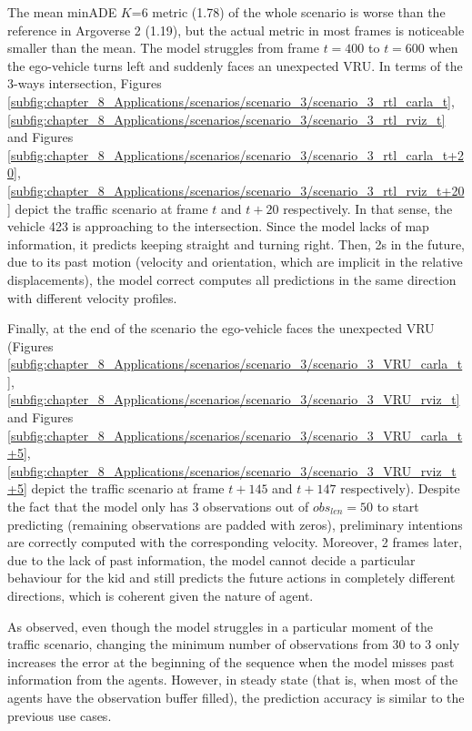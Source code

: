 The mean \ac{minADE} $K$=6 metric (1.78) of the whole scenario is worse than the reference in Argoverse 2 (1.19), but the actual metric in most frames is noticeable smaller than the mean. The model struggles from frame $t=400$ to $t=600$ when the ego-vehicle turns left and suddenly faces an unexpected \ac{VRU}. In terms of the 3-ways intersection, Figures \ref{subfig:chapter_8_Applications/scenarios/scenario_3/scenario_3_rtl_carla_t}, \ref{subfig:chapter_8_Applications/scenarios/scenario_3/scenario_3_rtl_rviz_t} and Figures \ref{subfig:chapter_8_Applications/scenarios/scenario_3/scenario_3_rtl_carla_t+20}, \ref{subfig:chapter_8_Applications/scenarios/scenario_3/scenario_3_rtl_rviz_t+20} depict the traffic scenario at frame $t$ and $t+20$ respectively. In that sense, the vehicle 423 is approaching to the intersection. Since the model lacks of map information, it predicts keeping straight and turning right. Then, 2s in the future, due to its past motion (velocity and orientation, which are implicit in the relative displacements), the model correct computes all predictions in the same direction with different velocity profiles.

Finally, at the end of the scenario the ego-vehicle faces the unexpected \ac{VRU} (Figures \ref{subfig:chapter_8_Applications/scenarios/scenario_3/scenario_3_VRU_carla_t}, \ref{subfig:chapter_8_Applications/scenarios/scenario_3/scenario_3_VRU_rviz_t} and Figures \ref{subfig:chapter_8_Applications/scenarios/scenario_3/scenario_3_VRU_carla_t+5}, \ref{subfig:chapter_8_Applications/scenarios/scenario_3/scenario_3_VRU_rviz_t+5} depict the traffic scenario at frame $t+145$ and $t+147$ respectively). Despite the fact that the model only has 3 observations out of $obs_{len}=50$ to start predicting (remaining observations are padded with zeros), preliminary intentions are correctly computed with the corresponding velocity. Moreover, 2 frames later, due to the lack of past information, the model cannot decide a particular behaviour for the kid and still predicts the future actions in completely different directions, which is coherent given the nature of agent.

As observed, even though the model struggles in a particular moment of the traffic scenario, changing the minimum number of observations from 30 to 3 only increases the error at the beginning of the sequence when the model misses past information from the agents. However, in steady state (that is, when most of the agents have the observation buffer filled), the prediction accuracy is similar to the previous use cases.

